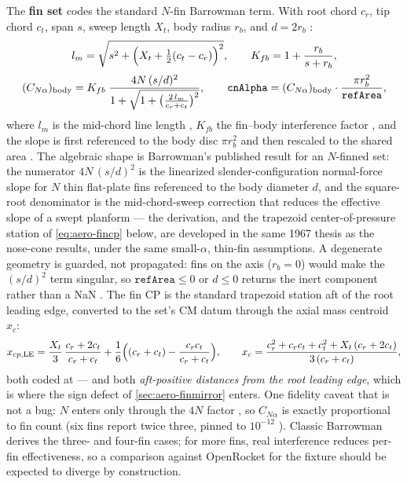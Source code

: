 The \textbf{fin set}  codes the standard $N$-fin Barrowman
term. With root chord $c_r$, tip chord $c_t$, span $s$, sweep length $X_t$, body radius
$r_b$, and $d = 2r_b$ :
\begin{gather}
l_m = \sqrt{s^2 + \Bigl(X_t + \tfrac{1}{2}(c_t - c_r)\Bigr)^2},
\qquad
K_{fb} = 1 + \frac{r_b}{s + r_b},
\label{eq:aero-finlm}\\[2pt]
(C_{N\alpha})_{\mathrm{body}} =
  K_{fb}\;\frac{4N\,(s/d)^2}{1 + \sqrt{1 + \bigl(\frac{2\,l_m}{c_r + c_t}\bigr)^2}},
\qquad
\mathtt{cnAlpha} = (C_{N\alpha})_{\mathrm{body}}\cdot\frac{\pi r_b^2}{\mathtt{refArea}},
\label{eq:aero-finslope}
\end{gather}
where $l_m$ is the mid-chord line length , $K_{fb}$ the
fin--body interference factor , and the slope is first
referenced to the body disc $\pi r_b^2$ and then rescaled to the shared area
. The algebraic shape is Barrowman's published result for
an $N$-finned set: the numerator $4N\,(s/d)^2$ is the linearized slender-configuration
normal-force slope for $N$ thin flat-plate fins referenced to the body diameter $d$, and
the square-root denominator is the mid-chord-sweep correction that reduces the effective
slope of a swept planform --- the derivation, and the trapezoid center-of-pressure station
of \cref{eq:aero-fincp} below, are developed in the same 1967 thesis as the nose-cone
results, under the same small-$\alpha$, thin-fin assumptions. A degenerate geometry is
guarded, not propagated: fins on
the axis ($r_b = 0$) would make the $(s/d)^2$ term singular, so
$\mathtt{refArea} \le 0$ or $d \le 0$ returns the inert component rather than a NaN
. The fin CP is the standard trapezoid station aft of the
root leading edge, converted to the set's CM datum through the axial mass centroid $x_c$:
\begin{equation}
x_{cp,\mathrm{LE}} = \frac{X_t}{3}\,\frac{c_r + 2c_t}{c_r + c_t}
  + \frac{1}{6}\Bigl((c_r + c_t) - \frac{c_r c_t}{c_r + c_t}\Bigr),
\qquad
x_c = \frac{c_r^2 + c_r c_t + c_t^2 + X_t\,(c_r + 2c_t)}{3\,(c_r + c_t)},
\label{eq:aero-fincp}
\end{equation}
both coded at  --- and both \emph{aft-positive distances
from the root leading edge}, which is where the sign defect of \cref{sec:aero-finmirror}
enters. One fidelity caveat that is not a bug: $N$ enters only through the $4N$ factor
, so $C_{N\alpha}$ is exactly proportional to fin count
(six fins report twice three, pinned to $10^{-12}$ ).
Classic Barrowman derives the three- and four-fin cases; for more fins, real interference
reduces per-fin effectiveness, so a comparison against OpenRocket for the
 fixture should be expected to diverge by construction.

